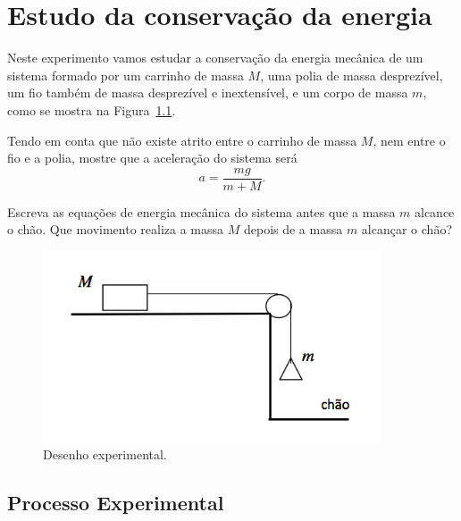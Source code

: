\chapter{Estudo da conservação da energia}

\vspace{-0.5cm}

Neste experimento vamos estudar a conservação da energia mecânica de um sistema formado por um carrinho de massa $M$, uma polia de massa desprezível, um fio também de massa desprezível e inextensível, e um corpo de massa $m$, como se mostra na Figura~\ref{fig:energia}.

Tendo em conta que não existe atrito entre o carrinho de massa $M$, nem entre o fio e a polia, mostre que a aceleração do sistema será
\begin{equation}
a = \frac{m g}{ m + M}.
\end{equation}
\noindent

Escreva as equações de energia mecânica do sistema antes que a massa $m$ alcance o chão. Que movimento realiza a massa $M$ depois de a massa $m$ alcançar o chão?

\begin{figure}[h]
\vspace{-0.2cm}
\begin{center}
\includegraphics[width=10cm]{fig/EnergiaEsquema}
\caption{\label{fig:energia} Desenho experimental.}
\vspace{-0.5cm}
\end{center}
\end{figure}


\section*{Processo Experimental}

